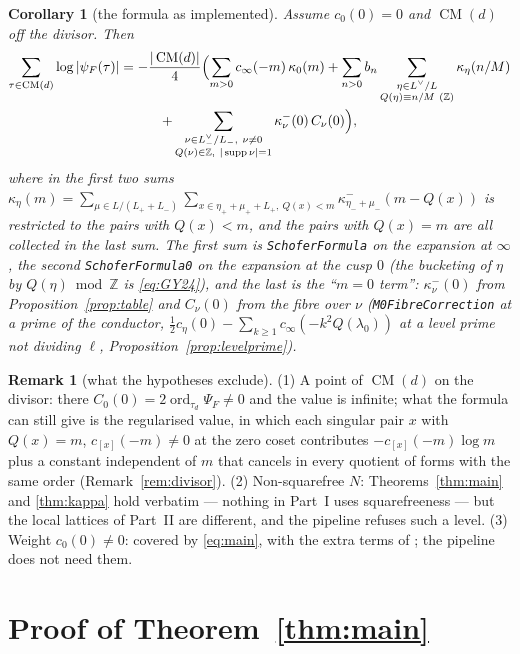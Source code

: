 \documentclass[11pt,reqno]{amsart}
\theoremstyle{plain}
\newtheorem{corollary}[theorem]{Corollary}
\theoremstyle{definition}
\newtheorem{remark}[theorem]{Remark}
\DeclareMathOperator{\ord}{ord}
\DeclareMathOperator{\supp}{supp}
\DeclareMathOperator{\CM}{CM}
\newcommand{\Z}{\mathbb{Z}}
\newcommand{\Ldual}{L^{\vee}}
\newcommand{\Lm}{L_{-}}
\newcommand{\Lp}{L_{+}}
\begin{document}
\begin{corollary}[the formula as implemented]\label{cor:impl}
Assume $c_0(0)=0$ and $\CM(d)$ off the divisor. Then
\begin{multline}\label{eq:impl}
  \sum_{\tau\in\CM(d)}\log|\psi_F(\tau)|=-\frac{|\CM(d)|}{4}\Bigl(
   \sum_{m>0}c_\infty(-m)\,\kappa_0(m)
  +\sum_{n>0}b_n\sum_{\substack{\eta\in\Ldual/L\\ Q(\eta)\equiv n/M\ (\Z)}}\kappa_\eta(n/M)
  \\
  +\sum_{\substack{\nu\in\Lm^\vee/\Lm,\ \nu\ne0\\ Q(\nu)\in\Z,\ |\supp\nu|=1}}
     \kappa^-_\nu(0)\,C_\nu(0)\Bigr),
\end{multline}
where in the first two sums $\kappa_\eta(m)=\sum_{\mu\in L/(\Lp+\Lm)}\sum_{x\in\eta_++\mu_++\Lp,
\ Q(x)<m}\kappa^-_{\eta_-+\mu_-}(m-Q(x))$ is \cite[(12)]{Yang} \emph{restricted to the pairs with
$Q(x)<m$}, and the pairs with $Q(x)=m$ are all collected in the last sum. The first sum is
\texttt{SchoferFormula} on the expansion at $\infty$, the second \texttt{SchoferFormula0} on the
expansion at the cusp $0$ (the bucketing of $\eta$ by $Q(\eta)\bmod\Z$ is \eqref{eq:GY24}), and the
last is the ``$m=0$ term'': $\kappa^-_\nu(0)$ from Proposition~\ref{prop:table} and $C_\nu(0)$ from
the fibre over $\nu$ (\texttt{M0FibreCorrection} at a prime of the conductor,
$\tfrac12c_\eta(0)-\sum_{k\ge1}c_\infty(-k^2Q(\lambda_0))$ at a level prime not dividing $\ell$,
Proposition~\ref{prop:levelprime}).
\end{corollary}

\begin{remark}[what the hypotheses exclude]
(1) A point of $\CM(d)$ on the divisor: there $C_0(0)=2\ord_{\tau_d}\Psi_F\ne0$ and the value is
infinite; what the formula can still give is the regularised value, in which each singular pair
$x$ with $Q(x)=m$, $c_{[x]}(-m)\neq0$ at the zero coset contributes $-c_{[x]}(-m)\log m$ plus a
constant independent of $m$ that cancels in every quotient of forms with the same order
(Remark~\ref{rem:divisor}). (2) Non-squarefree $N$: Theorems~\ref{thm:main} and \ref{thm:kappa}
hold verbatim --- nothing in Part~I uses squarefreeness --- but the local lattices of Part~II are
different, and the pipeline refuses such a level. (3) Weight $c_0(0)\ne0$: covered by
\eqref{eq:main}, with the extra terms of \cite[Thm.~B]{Yang}; the pipeline does not need them.
\end{remark}

\section{Proof of Theorem~\ref{thm:main}}\label{sec:proofmain}
\end{document}
